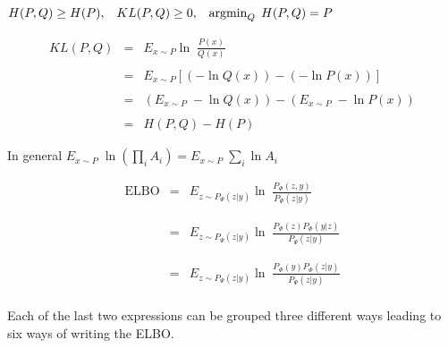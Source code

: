{\vfill
\centerline{{\color{red} $H(P,Q) \geq H(P),\;\;\;KL(P,Q) \geq 0,\;\;\;\operatorname*{argmin}_Q\;H(P,Q) = P$}}




\begin{eqnarray*}
KL(P,Q) & = & E_{x \sim P} \ln \;\frac{P(x)}{Q(x)} \\
\\
& = & E_{x \sim P} \left[(- \ln Q(x)) - (- \ln P(x))\right] \\
\\
& = & (E_{x\sim P} \;-\ln Q(x)) - (E_{x \sim P}\;-\ln P(x)) \\
\\
& = & H(P,Q) - H(P)
\end{eqnarray*}

\vfill
In general $E_{x \sim P} \;\ln \left(\prod_i A_i\right) = E_{x \sim P} \;\sum_i \ln A_i$ 


\begin{eqnarray*}
\mathrm{ELBO} & = & E_{z \sim P_\Psi(z|y)} \ln \;\frac{P_\Phi(z,y)}{P_\Psi(z|y)} \\
\\
\\
 & = & E_{z \sim P_\Psi(z|y)} \ln \;\frac{P_\Phi(z)P_\Phi(y|z)}{P_\Psi(z|y)} \\
\\
\\
 & = & E_{z \sim P_\Psi(z|y)} \ln \;\frac{P_\Phi(y)P_\Phi(z|y)}{P_\Psi(z|y)} \\
\end{eqnarray*}

\vfill
Each of the last two expressions can be grouped three different ways leading to six ways of writing the ELBO.

}

